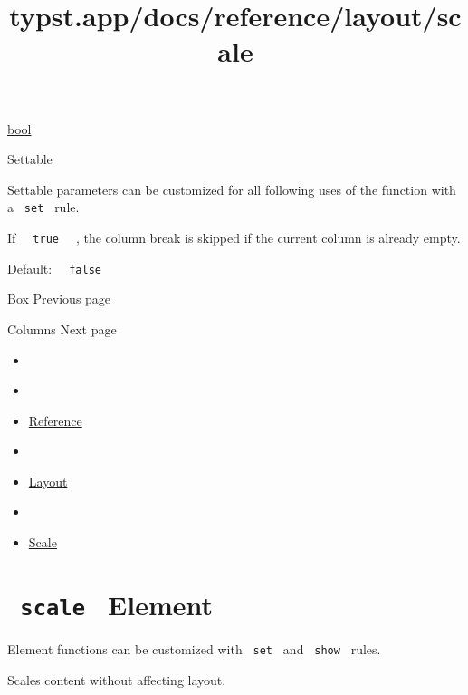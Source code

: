 \href{/docs/reference/foundations/bool/}{bool}

{{ Settable }}

\label{parameters-weak-settable-tooltip}
Settable parameters can be customized for all following uses of the
function with a \texttt{\ set\ } rule.

If \texttt{\ }{\texttt{\ true\ }}\texttt{\ } , the column break is
skipped if the current column is already empty.

Default: \texttt{\ }{\texttt{\ false\ }}\texttt{\ }

\href{/docs/reference/layout/box/}{\pandocbounded{}}

{ Box } { Previous page }

\href{/docs/reference/layout/columns/}{\pandocbounded{}}

{ Columns } { Next page }


\title{typst.app/docs/reference/layout/scale}

\begin{itemize}
\tightlist
\item
  \href{/docs}{}
\item
  
\item
  \href{/docs/reference/}{Reference}
\item
  
\item
  \href{/docs/reference/layout/}{Layout}
\item
  
\item
  \href{/docs/reference/layout/scale/}{Scale}
\end{itemize}

\section{\texorpdfstring{\texttt{\ scale\ } {{ Element
}}}{ scale   Element }}\label{summary}

\label{element-tooltip}
Element functions can be customized with \texttt{\ set\ } and
\texttt{\ show\ } rules.

Scales content without affecting layout.

